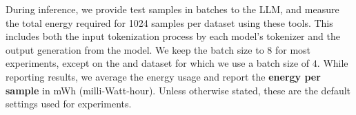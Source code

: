 During inference, we provide test samples in batches to the LLM, 
and measure the total energy required for 1024 samples per dataset using these tools. This includes both the input tokenization process by each model's tokenizer and the output generation from the model.
We keep the batch size to $8$ for most experiments, except on the \cnndm and \samsum dataset for which we use a batch size of $4$. 
While reporting results, we average the energy usage and report the \textbf{energy per sample} in mWh (milli-Watt-hour). Unless otherwise stated, these are the default settings used for experiments. 




